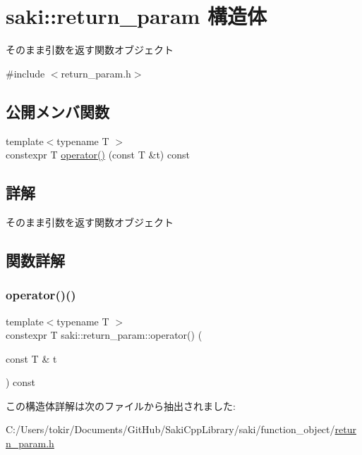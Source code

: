 \hypertarget{structsaki_1_1return__param}{}\section{saki\+:\+:return\+\_\+param 構造体}
\label{structsaki_1_1return__param}


そのまま引数を返す関数オブジェクト  




{\ttfamily \#include $<$return\+\_\+param.\+h$>$}

\subsection*{公開メンバ関数}
\begin{DoxyCompactItemize}
\item 
{\footnotesize template$<$typename T $>$ }\\constexpr T \mbox{\hyperlink{structsaki_1_1return__param_a5f46ee3ac78c1459267e3a39b30b31c3}{operator()}} (const T \&t) const
\end{DoxyCompactItemize}


\subsection{詳解}
そのまま引数を返す関数オブジェクト 

\subsection{関数詳解}
\mbox{\label{structsaki_1_1return__param_a5f46ee3ac78c1459267e3a39b30b31c3}} 
\subsubsection{\texorpdfstring{operator()()}{operator()()}}
{\footnotesize\ttfamily template$<$typename T $>$ \\
constexpr T saki\+::return\+\_\+param\+::operator() (\begin{DoxyParamCaption}\item[{const T \&}]{t }\end{DoxyParamCaption}) const\hspace{0.3cm}{\ttfamily [inline]}}



この構造体詳解は次のファイルから抽出されました\+:\begin{DoxyCompactItemize}
\item 
C\+:/\+Users/tokir/\+Documents/\+Git\+Hub/\+Saki\+Cpp\+Library/saki/function\+\_\+object/\mbox{\hyperlink{return__param_8h}{return\+\_\+param.\+h}}\end{DoxyCompactItemize}
